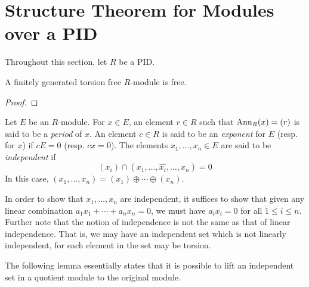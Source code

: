 \section{Structure Theorem for Modules over a PID}
Throughout this section, let $R$ be a PID.

\begin{lemma}
    A finitely generated torsion free $R$-module is free.
\end{lemma}
\begin{proof}
\end{proof}

\begin{definition}
    Let $E$ be an $R$-module. For $x\in E$, an element $r\in R$ such that $\operatorname{Ann}_R(x) = (r)$ is said to be a \textit{period} of $x$. An element $c\in R$ is said to be an \textit{exponent} for $E$ (resp. for $x$) if $cE = 0$ (resp. $cx = 0$). The elements $x_1,\ldots,x_n\in E$ are said to be \textit{independent} if 
    \begin{equation*}
        (x_i)\cap(x_1,\ldots,\widehat{x_i},\ldots,x_n) = 0
    \end{equation*}
    In this case, $(x_1,\ldots,x_n) = (x_1)\oplus\cdots\oplus(x_n)$.
\end{definition}

\begin{remark}
    In order to show that $x_1,\ldots,x_n$ are independent, it suffices to show that given any linear combination $a_1x_1 + \cdots + a_nx_n = 0$, we must have $a_ix_i = 0$ for all $1\le i\le n$. Further note that the notion of independence is not the same as that of linear independence. That is, we may have an independent set which is not linearly independent, for each element in the set may be torsion.
\end{remark}

The following lemma essentially states that it is possible to lift an independent set in a quotient module to the original module. 

